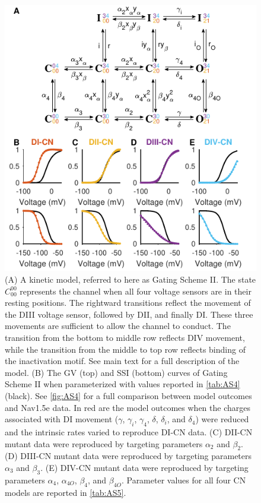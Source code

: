\begin{figure}[t]
\begin{minipage}[c]{85mm}
    \centering
    \includegraphics[width=\textwidth]{Figures/AppendixA/figure10.pdf}
\end{minipage}\hfill
\begin{minipage}[c]{70mm}
    \caption{
    (A) A kinetic model, referred to here as Gating Scheme II. The state $C_{00}^{00}$ represents the channel when all four voltage sensors are in their resting positions. The rightward transitions reflect the movement of the DIII voltage sensor, followed by DII, and finally DI. These three movements are sufficient to allow the channel to conduct. The transition from the bottom to middle row reflects DIV movement, while the transition from the middle to top row reflects binding of the inactivation motif. See main text for a full description of the model.
    (B) The GV (top) and SSI (bottom) curves of Gating Scheme II when parameterized with values reported in \autoref{tab:AS4} (black). See \autoref{fig:AS4} for a full comparison between model outcomes and Nav1.5e data. In red are the model outcomes when the charges associated with DI movement ($\gamma$, $\gamma_i$, $\gamma_4$, $\delta$, $\delta_i$, and $\delta_4$) were reduced and the intrinsic rates varied to reproduce DI-CN data. 
    (C) DII-CN mutant data were reproduced by targeting parameters $\alpha_2$ and $\beta_2$. 
    (D) DIII-CN mutant data were reproduced by targeting parameters $\alpha_3$ and $\beta_3$. 
    (E) DIV-CN mutant data were reproduced by targeting parameters $\alpha_4$, $\alpha_{4O}$, $\beta_4$, and $\beta_{4O}$. 
    Parameter values for all four CN models are reported in \autoref{tab:AS5}.
}
\label{fig:A10}
\end{minipage}
\end{figure}

